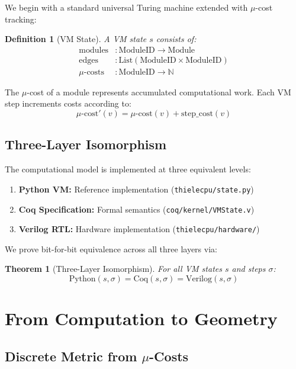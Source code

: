 \documentclass[11pt,twocolumn]{article}
\newtheorem{theorem}{Theorem}
\newtheorem{definition}{Definition}
\begin{document}
We begin with a standard universal Turing machine extended with $\mu$-cost tracking:

\begin{definition}[VM State]
A VM state $s$ consists of:
\begin{align*}
\text{modules} &: \text{ModuleID} \to \text{Module} \\
\text{edges} &: \text{List}(\text{ModuleID} \times \text{ModuleID}) \\
\text{$\mu$-costs} &: \text{ModuleID} \to \mathbb{N}
\end{align*}
\end{definition}

The $\mu$-cost of a module represents accumulated computational work. Each VM step increments costs according to:
\begin{equation}
\mu\text{-cost}'(v) = \mu\text{-cost}(v) + \text{step\_cost}(v)
\end{equation}

\subsection{Three-Layer Isomorphism}

The computational model is implemented at three equivalent levels:
\begin{enumerate}
\item \textbf{Python VM:} Reference implementation (\texttt{thielecpu/state.py})
\item \textbf{Coq Specification:} Formal semantics (\texttt{coq/kernel/VMState.v})
\item \textbf{Verilog RTL:} Hardware implementation (\texttt{thielecpu/hardware/})
\end{enumerate}

We prove bit-for-bit equivalence across all three layers via:
\begin{theorem}[Three-Layer Isomorphism]
For all VM states $s$ and steps $\sigma$:
\begin{equation}
\text{Python}(s,\sigma) = \text{Coq}(s,\sigma) = \text{Verilog}(s,\sigma)
\end{equation}
\end{theorem}

\section{From Computation to Geometry}

\subsection{Discrete Metric from $\mu$-Costs}
\end{document}
